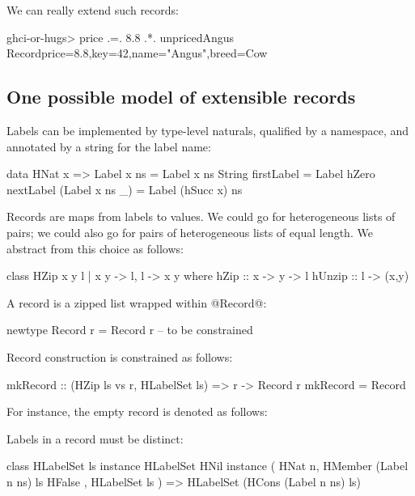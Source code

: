 \documentclass[nocopyrightspace,preprint]{sigplan-proc}
\begin{document}
We can really extend such records:

\begin{code}
 ghci-or-hugs> price .=. 8.8 .*. unpricedAngus
 Record{price=8.8,key=42,name="Angus",breed=Cow}
\end{code}


\medskip

\subsection*{One possible model of extensible records}

Labels can be implemented by type-level naturals, qualified by a
namespace, and annotated by a string for the label name:

\begin{code}
 data HNat x => Label x ns = Label x ns String
 firstLabel = Label hZero
 nextLabel (Label x ns _) = Label (hSucc x) ns
\end{code}

Records are maps from labels to values. We could go for heterogeneous
lists of pairs; we could also go for pairs of heterogeneous lists of
equal length. We abstract from this choice as follows:

\begin{code}
 class HZip x y l | x y -> l, l -> x y
  where hZip   :: x -> y -> l
        hUnzip :: l -> (x,y)
\end{code}

A record is a zipped list wrapped within @Record@:

\begin{code}
 newtype Record r = Record r -- to be constrained
\end{code}

Record construction is constrained as follows:

\begin{code}
 mkRecord :: (HZip ls vs r, HLabelSet ls)
          => r -> Record r
 mkRecord = Record
\end{code}

For instance, the empty record is denoted as follows:


Labels in a record must be distinct:

\begin{code}
 class HLabelSet ls
 instance HLabelSet HNil
 instance ( HNat n, HMember (Label n ns) ls HFalse
          , HLabelSet ls )
       =>   HLabelSet (HCons (Label n ns) ls)
\end{code}
\end{document}
